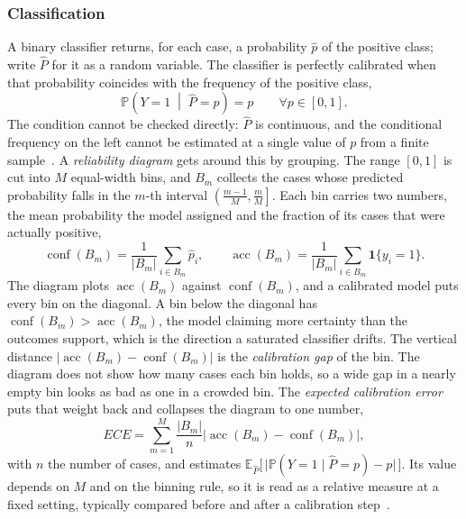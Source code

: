     \subsubsection{Classification}
        A binary classifier returns, for each case, a probability $\hat{p}$ of the
        positive class; write $\hat{P}$ for it as a random variable. The classifier
        is perfectly calibrated when that probability coincides with the frequency
        of the positive class,
        \begin{equation}
            \mathbb{P}\!\left( Y = 1 \;\middle|\; \hat{P} = p \right) = p
            \qquad \forall p \in [0, 1].
            \label{eq:bg:unc:calibclf}
        \end{equation}
        The condition cannot be checked directly: $\hat{P}$ is
        continuous, and the conditional frequency on the left cannot be estimated at a
        single value of $p$ from a finite sample~\cite{guo2017}.
        A \emph{reliability diagram} gets around this by grouping. The range $[0, 1]$ is
        cut into $M$ equal-width bins, and $B_m$ collects the cases whose predicted
        probability falls in the $m$-th interval
        $\left( \tfrac{m-1}{M}, \tfrac{m}{M} \right]$. Each bin carries two numbers, the
        mean probability the model assigned and the fraction of its cases that were
        actually positive,
        \begin{equation}
            \operatorname{conf}(B_m) = \frac{1}{\lvert B_m \rvert} \sum_{i \in B_m} \hat{p}_i ,
            \qquad
            \operatorname{acc}(B_m) = \frac{1}{\lvert B_m \rvert} \sum_{i \in B_m} \mathbf{1}\{ y_i = 1 \} .
            \label{eq:bg:unc:confacc}
        \end{equation}
        The diagram plots $\operatorname{acc}(B_m)$ against $\operatorname{conf}(B_m)$,
        and a calibrated model puts every bin on the diagonal. A bin below the diagonal
        has $\operatorname{conf}(B_m) > \operatorname{acc}(B_m)$, the model claiming more
        certainty than the outcomes support, which is the direction a saturated
        classifier drifts. The vertical distance
        $\lvert \operatorname{acc}(B_m) - \operatorname{conf}(B_m) \rvert$ is the
        \emph{calibration gap} of the bin. The diagram does not show how many cases
        each bin holds, so a wide gap in a nearly empty bin looks as bad as one in a
        crowded bin.
        The \emph{expected calibration error} puts that weight back and collapses the
        diagram to one number,
        \begin{equation}
            ECE = \sum_{m=1}^{M} \frac{\lvert B_m \rvert}{n}
            \bigl\lvert \operatorname{acc}(B_m) - \operatorname{conf}(B_m) \bigr\rvert ,
            \label{eq:bg:unc:ece}
        \end{equation}
        with $n$ the number of cases, and estimates
        $\mathbb{E}_{\hat{P}}\bigl[\, \lvert \mathbb{P}(Y = 1 \mid \hat{P} = p) - p \rvert \,\bigr]$.
        Its value depends on $M$ and on the binning rule, so it is read as a
        relative measure at a fixed setting, typically compared before and after a
        calibration step~\cite{naeini2015}.

